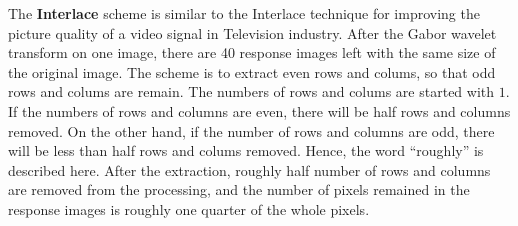 The \textbf{Interlace} scheme is similar to the Interlace technique \cite{Ballard1939} for improving the picture quality of a video signal in Television industry. After the Gabor wavelet transform on one image, there are 40 response images left with the same size of the original image. The scheme is to extract even rows and colums, so that odd rows and colums are remain. The numbers of rows and colums are started with $1$. If the numbers of rows and columns are even, there will be half rows and columns removed. On the other hand, if the number of rows and columns are odd, there will be less than half rows and colums removed. Hence, the word ``roughly'' is described here. After the extraction, roughly half number of rows and columns are removed from the processing, and the number of pixels remained in the response images is roughly one quarter of the whole pixels. 

